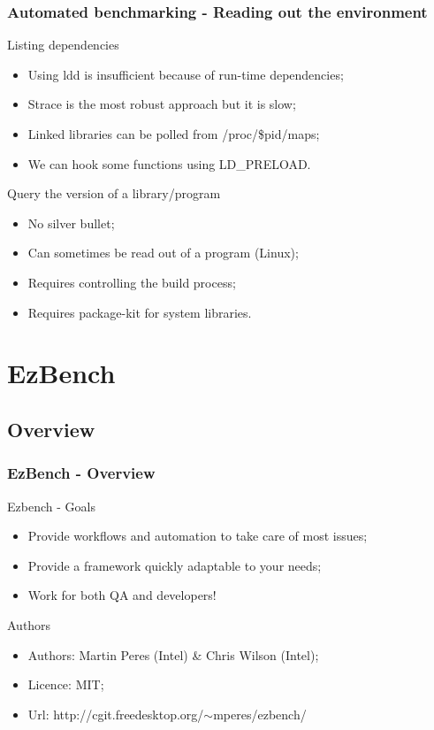 \documentclass[11pt,english,compress]{beamer}
\begin{document}
\begin{frame}
	\frametitle{Automated benchmarking - Reading out the environment}

	\begin{block}{Listing dependencies}
		\begin{itemize}
			\item Using ldd is insufficient because of run-time dependencies;\pause
			\item Strace is the most robust approach but it is slow;\pause
			\item Linked libraries can be polled from /proc/\$pid/maps;\pause
			\item We can hook some functions using LD\_PRELOAD.
		\end{itemize}
	\end{block}
	
	\pause
	
	\begin{block}{Query the version of a library/program}
		\begin{itemize}
			\item No silver bullet;\pause
			\item Can sometimes be read out of a program (Linux);\pause
			\item Requires controlling the build process;\pause
			\item Requires package-kit for system libraries.
		\end{itemize}
	\end{block}
\end{frame}

\section{EzBench}
\subsection{Overview}
\begin{frame}
	\frametitle{EzBench - Overview}

	\begin{block}{Ezbench - Goals}
		\begin{itemize}
			\item Provide workflows and automation to take care of most issues;\pause
			\item Provide a framework quickly adaptable to your needs;\pause
			\item Work for both QA and developers!
		\end{itemize}
	\end{block}
	
	\pause
	
	\begin{block}{Authors}
		\begin{itemize}
			\item Authors: Martin Peres (Intel) \& Chris Wilson (Intel);
			\item Licence: MIT;
			\item Url: http://cgit.freedesktop.org/$\sim$mperes/ezbench/
		\end{itemize}
	\end{block}
\end{frame}
\end{document}
